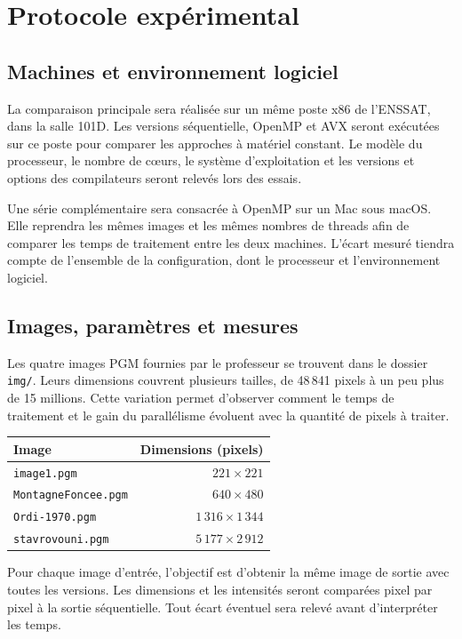 \section{Protocole expérimental}

\subsection{Machines et environnement logiciel}

La comparaison principale sera réalisée sur un même poste x86 de l'ENSSAT, dans la salle 101D. Les versions séquentielle, OpenMP et AVX seront exécutées sur ce poste pour comparer les approches à matériel constant. Le modèle du processeur, le nombre de cœurs, le système d'exploitation et les versions et options des compilateurs seront relevés lors des essais.

Une série complémentaire sera consacrée à OpenMP sur un Mac sous macOS. Elle reprendra les mêmes images et les mêmes nombres de threads afin de comparer les temps de traitement entre les deux machines. L'écart mesuré tiendra compte de l'ensemble de la configuration, dont le processeur et l'environnement logiciel.

\subsection{Images, paramètres et mesures}

Les quatre images PGM fournies par le professeur se trouvent dans le dossier \texttt{img/}. Leurs dimensions couvrent plusieurs tailles, de 48\,841 pixels à un peu plus de 15 millions. Cette variation permet d'observer comment le temps de traitement et le gain du parallélisme évoluent avec la quantité de pixels à traiter.

\begin{center}
\begin{tabular}{lr}
\toprule
Image & Dimensions (pixels) \\
\midrule
\texttt{image1.pgm} & \(221 \times 221\) \\
\texttt{MontagneFoncee.pgm} & \(640 \times 480\) \\
\texttt{Ordi-1970.pgm} & \(1\,316 \times 1\,344\) \\
\texttt{stavrovouni.pgm} & \(5\,177 \times 2\,912\) \\
\bottomrule
\end{tabular}
\end{center}

Pour chaque image d'entrée, l'objectif est d'obtenir la même image de sortie avec toutes les versions. Les dimensions et les intensités seront comparées pixel par pixel à la sortie séquentielle. Tout écart éventuel sera relevé avant d'interpréter les temps.

